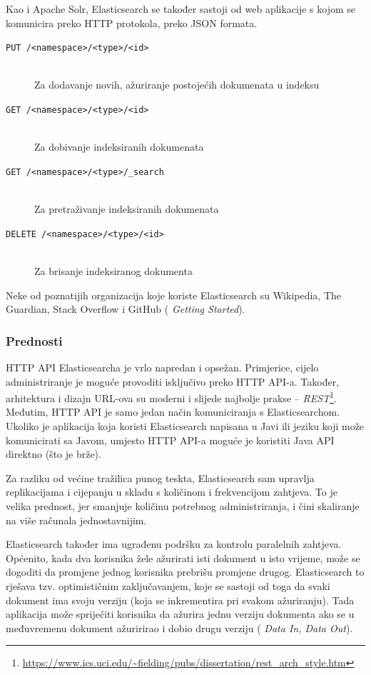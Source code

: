 \documentclass[a4paper,twoside,12pt]{scrreprt}
\begin{document}
Kao i Apache Solr, Elasticsearch se također sastoji od web aplikacije s kojom se komunicira preko HTTP protokola, preko JSON formata.

\begin{description}
  \item[\texttt{PUT /<namespace>/<type>/<id>}] \hfill \\ Za dodavanje novih, ažuriranje postojećih dokumenata u indeksu
  \item[\texttt{GET /<namespace>/<type>/<id>}] \hfill \\ Za dobivanje indeksiranih dokumenata
  \item[\texttt{GET /<namespace>/<type>/\_search}] \hfill \\ Za pretraživanje indeksiranih dokumenata
  \item[\texttt{DELETE /<namespace>/<type>/<id>}] \hfill \\ Za brisanje indeksiranog dokumenta
\end{description}

Neke od poznatijih organizacija koje koriste Elasticsearch su Wikipedia, The Guardian, Stack Overflow i GitHub (\cite{elasticguide} \textit{Getting Started}).

\subsubsection{Prednosti}

HTTP API Elasticsearcha je vrlo napredan i opsežan. Primjerice, cijelo administriranje je moguće provoditi isključivo preko HTTP API-a. Također, arhitektura i dizajn URL-ova su moderni i slijede najbolje prakse – \textit{REST}\footnote{\url{https://www.ics.uci.edu/~fielding/pubs/dissertation/rest_arch_style.htm}}. Međutim, HTTP API je samo jedan način komuniciranja s Elasticsearchom. Ukoliko je aplikacija koja koristi Elasticsearch napisana u Javi ili jeziku koji može komunicirati sa Javom, umjesto HTTP API-a moguće je koristiti Java API direktno (što je brže).

Za razliku od većine tražilica punog teskta, Elasticsearch sam upravlja replikacijama i cijepanju u skladu s količinom i frekvencijom zahtjeva. To je velika prednost, jer smanjuje količinu potrebnog administriranja, i čini skaliranje na više računala jednostavnijim.

Elasticsearch također ima ugrađenu podršku za kontrolu paralelnih zahtjeva. Općenito, kada dva korisnika žele ažurirati isti dokument u isto vrijeme, može se dogoditi da promjene jednog korisnika prebrišu promjene drugog. Elasticsearch to rješava tzv. optimističnim zaključavanjem, koje se sastoji od toga da svaki dokument ima svoju verziju (koja se inkrementira pri svakom ažuriranju). Tada aplikacija može spriječiti korisnika da ažurira jednu verziju dokumenta ako se u međuvremenu dokument ažuririrao i dobio drugu verziju (\cite{elasticguide} \textit{Data In, Data Out}).
\end{document}
